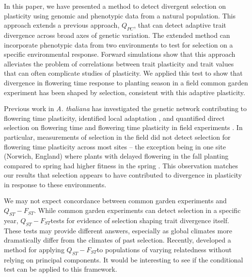 \documentclass[11pt,letterpaper]{article}
\newcommand{\qpc}{$Q_{PC}$}
\newcommand{\qf}{$Q_{ST}-F_{ST}$}
\begin{document}
In this paper, we have presented a method to detect divergent selection on plasticity using genomic and phenotypic data from a natural population. 
This approach extends a previous approach, \qpc, that can detect adaptive trait divergence across broad axes of genetic variation.
The extended method can incorporate phenotypic data from two environments to test for selection on a specific environmental response.
Forward simulations show that this approach alleviates the problem of correlations between trait plasticity and trait values that can often complicate studies of plasticity.
We applied this test to show that divergence in flowering time response to planting season in a field common garden experiment has been shaped by selection, consistent with this adaptive plasticity.


Previous work in \textit{A. thaliana} has investigated the genetic network contributing to flowering time plasticity\citep{wilczek2009effects}, identified local adaptation \citep{fournier2011map, aagren2013genetic}, and quantified direct selection on flowering time \citep{exposito2018spatio, aagren2017adaptive} and flowering time plasticity in field experiments \citep{fournier2022adaptive}.
In particular, measurements of selection in the field did not detect selection for flowering time plasticity across most sites -- the exception being in one site (Norwich, England) where plants with delayed flowering in the fall planting compared to spring had higher fitness in the spring \citep{fournier2022adaptive}.
This observation matches our results that selection appears to have contributed to divergence in plasticity in response to these environments.

We may not expect concordance between common garden experiments and \qf.
While common garden experiments can detect selection in a specific year, \qf tests for evidence of selection shaping trait divergence itself.
These tests may provide different answers, especially as global climates more dramatically differ from the climates of past selection.
Recently, \cite{do2025method} developed a method for applying \qf to populations of varying relatedness without relying on principal components. 
It would be interesting to see if the conditional test can be applied to this framework.
\end{document}
